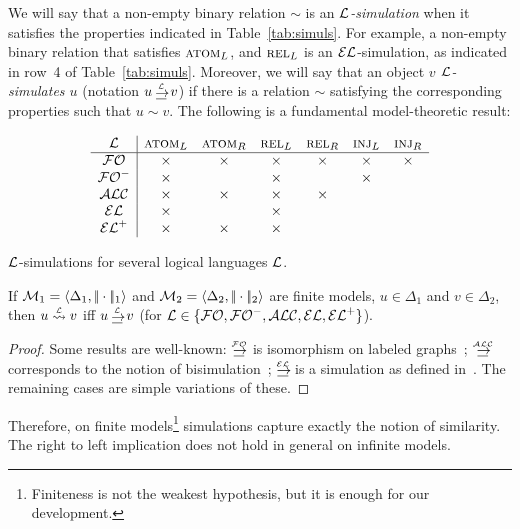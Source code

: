 We will say that a non-empty binary relation $\sim$ is an
\emph{$\mathcal{L}$-simulation} when it satisfies the properties indicated
in Table~\ref{tab:simuls}. For example, a non-empty binary relation that satisfies $\textsc{atom}_L$, and $\textsc{rel}_L$ is an $\mathcal{EL}$-simulation, as indicated in row~4 of Table~\ref{tab:simuls}. Moreover, we will say that an object
\emph{$v$ $\mathcal{L}$-simulates $u$} (notation $u \simul{\+L} v$) if there
is a relation $\sim$ satisfying the corresponding properties such that
$u \sim v$. The following is a fundamental model-theoretic result:%

\begin{table}[t]
$$
\begin{array}{c|cccccc}
  \mathcal{L} & \textsc{atom}_L & \textsc{atom}_R & \textsc{rel}_L & \textsc{rel}_R & \textsc{inj}_L\space & \textsc{inj}_R\space \\
  \hline
  \mathcal{FO}   & \times & \times & \times & \times & \times & \times\\
  {\mathcal{FO}^-} & \times & & \times && \times &\\
  \mathcal{ALC}   & \times & \times & \times & \times&&\\
  \mathcal{EL}    & \times & &  \times & &\\
  {\mathcal{EL}^+}  & \times & \times &  \times & &\\
\end{array}
$$
\caption{$\mathcal{L}$-simulations for several logical languages $\mathcal{L}$.}\label{tab:simuls}
\end{table}

\begin{theorem} \label{thm:simulation}
If  $\mathcal{M}_1 = \langle \Delta_1, |\!|\cdot|\!|_1\rangle$ and $\mathcal{M}_2 =
\langle \Delta_2, |\!|\cdot|\!|_2\rangle$ are finite models, $u \in
\Delta_1$ and $v \in \Delta_2$, then $u \simil{\+L} v$ iff $u
\simul{\+L} v$ (for $\mathcal{L} \in \{\mathcal{FO},{\mathcal{FO}^-},\mathcal{ALC},\mathcal{EL},{\mathcal{EL}^+}\}$).
\end{theorem}
\begin{proof}
Some results are well-known: $\simul{\FOL}$ is isomorphism on
labeled graphs~\cite{ebbi:math96}; $\simul{\ALC}$ corresponds to the
notion of bisimulation~\cite[Def.~2.16]{BRV01}; $\simul{\EL}$ is a
simulation as defined in~\cite[Def.~2.77]{BRV01}. The remaining
cases are simple variations of these.
\end{proof}

Therefore, on finite models\footnote{Finiteness is not the weakest hypothesis,
but it is enough for our development.} simulations capture exactly the notion of similarity.
The right to left implication does not hold in general on infinite
models.

